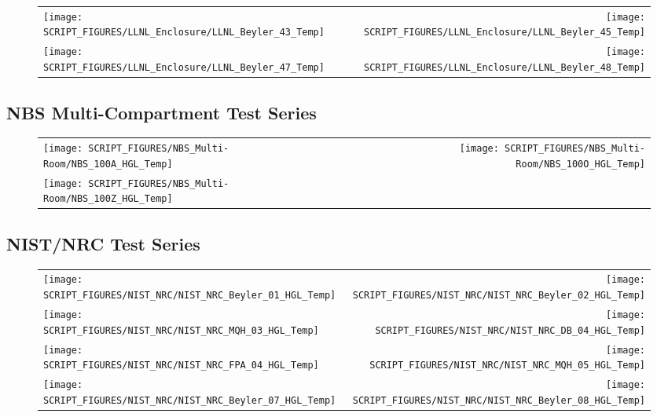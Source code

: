 \begin{figure}[p]
\begin{tabular*}{\textwidth}{l@{\extracolsep{\fill}}r}
\texttt{[image: SCRIPT\_FIGURES/LLNL\_Enclosure/LLNL\_Beyler\_43\_Temp]} &
\texttt{[image: SCRIPT\_FIGURES/LLNL\_Enclosure/LLNL\_Beyler\_45\_Temp]} \\
\texttt{[image: SCRIPT\_FIGURES/LLNL\_Enclosure/LLNL\_Beyler\_47\_Temp]} &
\texttt{[image: SCRIPT\_FIGURES/LLNL\_Enclosure/LLNL\_Beyler\_48\_Temp]}
\end{tabular*}
\end{figure}

\clearpage

\subsection{NBS Multi-Compartment Test Series}

\begin{figure}[p]
\begin{tabular*}{\textwidth}{l@{\extracolsep{\fill}}r}
\texttt{[image: SCRIPT\_FIGURES/NBS\_Multi-Room/NBS\_100A\_HGL\_Temp]} &
\texttt{[image: SCRIPT\_FIGURES/NBS\_Multi-Room/NBS\_100O\_HGL\_Temp]} \\
\texttt{[image: SCRIPT\_FIGURES/NBS\_Multi-Room/NBS\_100Z\_HGL\_Temp]}
\end{tabular*}
\end{figure}

\clearpage

\subsection{NIST/NRC Test Series}

\begin{figure}[p]
\begin{tabular*}{\textwidth}{l@{\extracolsep{\fill}}r}
\texttt{[image: SCRIPT\_FIGURES/NIST\_NRC/NIST\_NRC\_Beyler\_01\_HGL\_Temp]} &
\texttt{[image: SCRIPT\_FIGURES/NIST\_NRC/NIST\_NRC\_Beyler\_02\_HGL\_Temp]} \\
\texttt{[image: SCRIPT\_FIGURES/NIST\_NRC/NIST\_NRC\_MQH\_03\_HGL\_Temp]} &
\texttt{[image: SCRIPT\_FIGURES/NIST\_NRC/NIST\_NRC\_DB\_04\_HGL\_Temp]} \\
\texttt{[image: SCRIPT\_FIGURES/NIST\_NRC/NIST\_NRC\_FPA\_04\_HGL\_Temp]} &
\texttt{[image: SCRIPT\_FIGURES/NIST\_NRC/NIST\_NRC\_MQH\_05\_HGL\_Temp]} \\
\texttt{[image: SCRIPT\_FIGURES/NIST\_NRC/NIST\_NRC\_Beyler\_07\_HGL\_Temp]} &
\texttt{[image: SCRIPT\_FIGURES/NIST\_NRC/NIST\_NRC\_Beyler\_08\_HGL\_Temp]}
\end{tabular*}
\end{figure}

